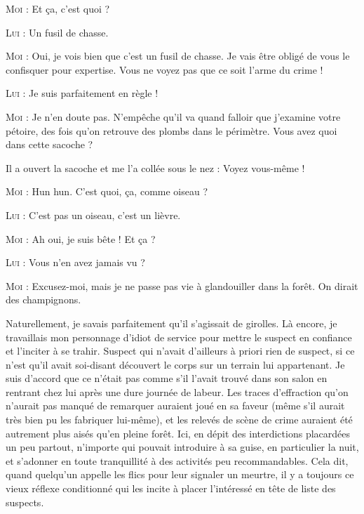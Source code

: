 \begin{dialogue}

\textsc{Moi} : Et ça, c’est quoi ?

\textsc{Lui} : Un fusil de chasse.

\textsc{Moi} : Oui, je vois bien que c’est un fusil de chasse. Je vais être obligé de vous le confisquer pour expertise. Vous ne voyez pas que ce soit l’arme du crime !

\textsc{Lui} : Je suis parfaitement en règle !

\textsc{Moi} : Je n’en doute pas. N’empêche qu’il va quand falloir que j’examine votre pétoire, des fois qu’on retrouve des plombs dans le périmètre. Vous avez quoi dans cette sacoche ?

Il a ouvert la sacoche et me l’a collée sous le nez : Voyez vous-même !

\textsc{Moi} : Hun hun. C’est quoi, ça, comme oiseau ?

\textsc{Lui} : C’est pas un oiseau, c’est un lièvre.

\textsc{Moi} : Ah oui, je suis bête ! Et ça ?

\textsc{Lui} : Vous n’en avez jamais vu ?

\textsc{Moi} : Excusez-moi, mais je ne passe pas vie à glandouiller dans la forêt. On dirait des champignons.

\end{dialogue}

%
%
Naturellement, je savais parfaitement qu’il s’agissait de girolles. Là encore, je travaillais mon personnage d’idiot de service pour mettre le suspect en confiance et l’inciter à se trahir. Suspect qui n’avait d’ailleurs à priori rien de suspect, si ce n’est qu’il avait soi-disant découvert le corps sur un terrain lui appartenant. Je suis d’accord que ce n’était pas comme s’il l’avait trouvé dans son salon en rentrant chez lui après une dure journée de labeur. Les traces d’effraction qu’on n’aurait pas manqué de remarquer auraient joué en sa faveur (même s’il aurait très bien pu les fabriquer lui-même), et les relevés de scène de crime auraient été autrement plus aisés qu’en pleine forêt. Ici, en dépit des interdictions placardées un peu partout, n’importe qui pouvait introduire à sa guise, en particulier la nuit, et s’adonner en toute tranquillité à des activités peu recommandables. Cela dit, quand quelqu’un appelle les flics pour leur signaler un meurtre, il y a toujours ce vieux réflexe conditionné qui les incite à placer l’intéressé en tête de liste des suspects. 

